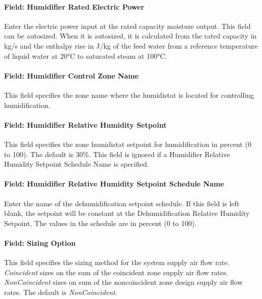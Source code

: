 \paragraph{Field: Humidifier Rated Electric Power}\label{field-humidifier-rated-electric-power-2}

Enter the electric power input at the rated capacity moisture output. This field can be autosized. When it is autosized, it is calculated from the rated capacity in kg/s and the enthalpy rise in J/kg of the feed water from a reference temperature of liquid water at 20°C to saturated steam at 100°C.

\paragraph{Field: Humidifier Control Zone Name}\label{field-humidifier-control-zone-name-2}

This field specifies the zone name where the humidistat is located for controlling humidification.

\paragraph{Field: Humidifier Relative Humidity Setpoint}\label{field-humidifier-relative-humidity-setpoint}

This field specifies the zone humidistat setpoint for humidification in percent (0 to 100). The default is 30\%. This field is ignored if a Humidifier Relative Humidity Setpoint Schedule Name is specified.

\paragraph{Field: Humidifier Relative Humidity Setpoint Schedule Name}\label{field-humidifier-relative-humidity-setpoint-schedule-name}

Enter the name of the dehumidification setpoint schedule. If this field is left blank, the setpoint will be constant at the Dehumidification Relative Humidity Setpoint, The values in the schedule are in percent (0 to 100).

\paragraph{Field: Sizing Option}\label{field-sizing-option-000}

This field specifies the sizing method for the system supply air flow rate. \emph{Coincident} sizes on the sum of the coincident zone supply air flow rates. \emph{NonCoincident} sizes on sum of the noncoincident zone design supply air flow rates. The default is \emph{NonCoincident}.

